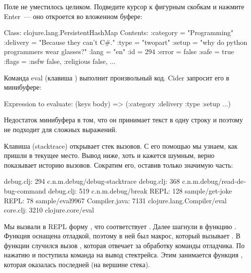 Поле  не уместилось целиком. Подведите курсор к фигурным скобкам и нажмите Enter~--- оно откроется во вложенном буфере:

\begin{english}
  \begin{text}
Class: clojure.lang.PersistentHashMap
Contents:
  :category = "Programming"
  :delivery = "Because they can't C#."
  :type = "twopart"
  :setup = "why do python programmers wear glasses?"
  :lang = "en"
  :id = 294
  :error = false
  :safe = true
  :flags = { :nsfw false, :religious false, ... }
  \end{text}
\end{english}

Команда eval (клавиша ) выполнит произвольный код. Cider запросит его в минибуфере:

\begin{english}
  \begin{text}
Expression to evaluate: (keys body)
=> (:category :delivery :type :setup ...)
  \end{text}
\end{english}

Недостаток минибуфера в том, что он принимает текст в одну строку и поэтому не подходит для сложных выражений.

Клавиша  (stacktrace) открывает стек вызовов. С его помощью мы узнаем, как пришли в текущее место. Вывод ниже, хоть и кажется шумным, верно показывает историю вызовов. Сократим его, оставив только значимую часть:

\begin{english}
  \begin{text}
    debug.clj:  294  c.n.m.debug/debug-stacktrace
    debug.clj:  368  c.n.m.debug/read-debug-command
    debug.clj:  519  c.n.m.debug/break
         REPL:  128  sample/get-joke
         REPL:   78  sample/eval9967
Compiler.java: 7131  clojure.lang.Compiler/eval
     core.clj: 3210  clojure.core/eval
  \end{text}
\end{english}

Мы вызвали в REPL форму , что соответствует . Далее шагнули в функцию . Функция оснащена отладкой, поэтому в ней был макрос, который вызывает . В функции  случился вызов , которая отвечает за обработку команды отладчика. По нажатию  и поступила команда на вывод стектрейса. Этим занимается функция , которая оказалась последней (на вершине стека).

